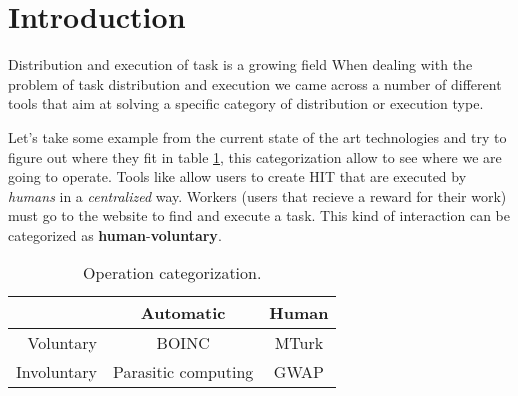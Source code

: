 
\cleardoublepage
{}

\chapter*{Introduction}
\label{intro}



Distribution and execution of task is a growing field 
When dealing with the problem of task distribution and execution we came across a number of different tools
that aim at solving a specific category of distribution or execution type. 

Let's take some example from the current state of the art technologies and try to figure out where they
fit in table \ref{tab:matrix}, this categorization allow to see where we are going to operate.
Tools like \cite{turk} allow users to create \ac{HIT} that are executed by \emph{humans} in a \emph{centralized}
way. Workers (users that recieve a reward for their work) must go to the \cite{turk} website to find and
execute a task. This kind of interaction can be categorized as \textbf{human}-\textbf{voluntary}.



\begin{table}[htb]
	\caption{Operation categorization.}
	\label{tab:matrix}
	\centering
	\begin{tabular}{r|c|c}
		 & \textbf{Automatic} & \textbf{Human}\\
		\hline
		Voluntary & \acs{BOINC} & MTurk\\
		\hline
		Involuntary & Parasitic computing & \acs{GWAP}
	\end{tabular}
\end{table}



